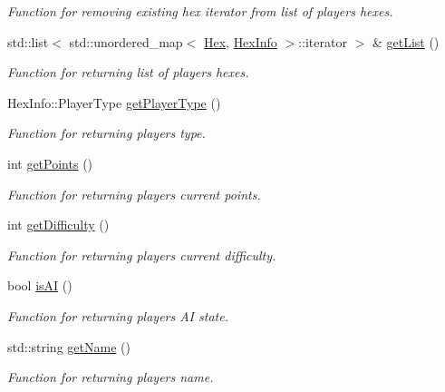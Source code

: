 \begin{DoxyCompactItemize}
\begin{DoxyCompactList}\small\item\em Function for removing existing hex iterator from list of players hexes. \end{DoxyCompactList}\item 
std\+::list$<$ std\+::unordered\+\_\+map$<$ \hyperlink{classHex}{Hex}, \hyperlink{structHexInfo}{Hex\+Info} $>$\+::iterator $>$ \& \hyperlink{classPlayer_ad592d62507efe19d3375ecbb3ed92bbc}{get\+List} ()
\begin{DoxyCompactList}\small\item\em Function for returning list of players hexes. \end{DoxyCompactList}\item 
Hex\+Info\+::\+Player\+Type \hyperlink{classPlayer_ac8a3e7580e371e023e789049617fb468}{get\+Player\+Type} ()
\begin{DoxyCompactList}\small\item\em Function for returning players type. \end{DoxyCompactList}\item 
int \hyperlink{classPlayer_ab98ee3c0e10f7b2b65ad43b2a2929445}{get\+Points} ()
\begin{DoxyCompactList}\small\item\em Function for returning players current points. \end{DoxyCompactList}\item 
int \hyperlink{classPlayer_ab6c18e50efbb4252fa4be0508b1e7178}{get\+Difficulty} ()
\begin{DoxyCompactList}\small\item\em Function for returning players current difficulty. \end{DoxyCompactList}\item 
bool \hyperlink{classPlayer_ae38022bf2dfc8d84b0e93a281529462c}{is\+AI} ()
\begin{DoxyCompactList}\small\item\em Function for returning players AI state. \end{DoxyCompactList}\item 
std\+::string \hyperlink{classPlayer_af1aa472885d589516f483e26e786600e}{get\+Name} ()
\begin{DoxyCompactList}\small\item\em Function for returning players name. \end{DoxyCompactList}\end{DoxyCompactItemize}
